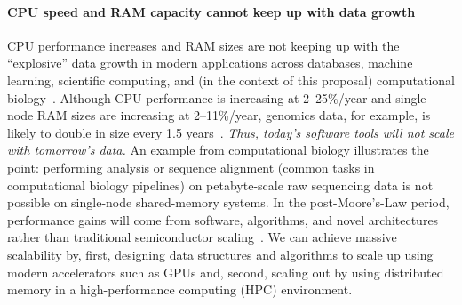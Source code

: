 
\paragraph{CPU speed and RAM capacity cannot keep up with data growth} CPU
performance increases and RAM sizes are not keeping up with the ``explosive'' data growth in
modern applications across databases, machine learning, scientific computing, and (in the context of this proposal) computational biology~\cite{Chen:2021:TGS}. Although CPU performance is increasing at
2--25\%/year and single-node RAM sizes are increasing at 2--11\%/year, genomics
data, for example, is likely to double in size every 1.5 years~\cite{kodama2012sequence}. 
\emph{Thus, today's software tools will not scale with tomorrow's data.} An example from computational biology illustrates the point: performing \kmer analysis or sequence alignment (common tasks in
computational biology pipelines) on petabyte-scale raw sequencing data is not
possible on single-node shared-memory systems. In the post-Moore’s-Law period,
performance gains will come from software, algorithms, and novel architectures rather than
traditional semiconductor scaling~\cite{leiserson2020there}. We can achieve massive scalability by,
first, designing data structures and algorithms to scale up using modern
accelerators such as GPUs and, second, scaling out by using distributed memory
in a high-performance computing (HPC) environment.



